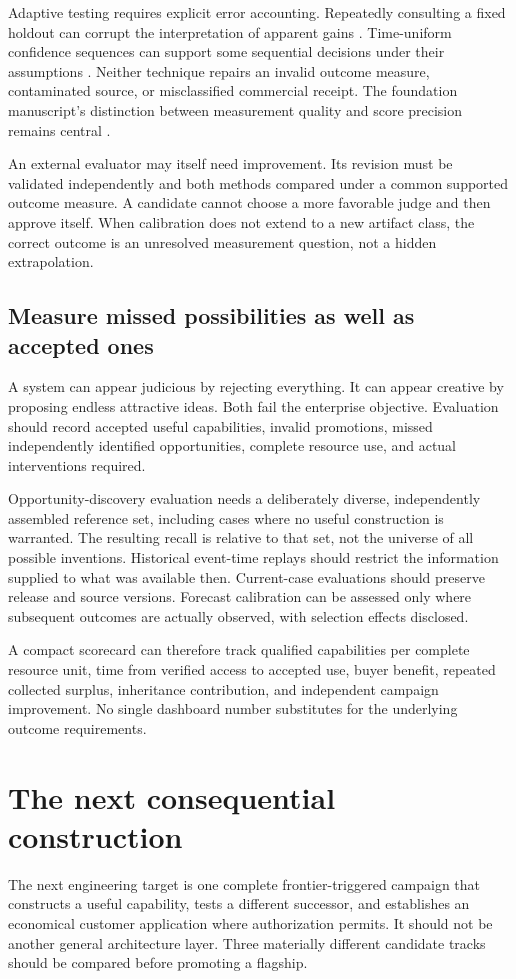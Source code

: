 \documentclass[11pt,letterpaper]{article}
\theoremstyle{remark}\newtheorem{remark}{Remark}[section]
\begin{document}
Adaptive testing requires explicit error accounting. Repeatedly consulting a fixed holdout can corrupt the interpretation of apparent gains \citep{dwork2014}. Time-uniform confidence sequences can support some sequential decisions under their assumptions \citep{howard2021}. Neither technique repairs an invalid outcome measure, contaminated source, or misclassified commercial receipt. The foundation manuscript's distinction between measurement quality and score precision remains central \citep{boucher2026ti}.

An external evaluator may itself need improvement. Its revision must be validated independently and both methods compared under a common supported outcome measure. A candidate cannot choose a more favorable judge and then approve itself. When calibration does not extend to a new artifact class, the correct outcome is an unresolved measurement question, not a hidden extrapolation.

\subsection{Measure missed possibilities as well as accepted ones}
A system can appear judicious by rejecting everything. It can appear creative by proposing endless attractive ideas. Both fail the enterprise objective. Evaluation should record accepted useful capabilities, invalid promotions, missed independently identified opportunities, complete resource use, and actual interventions required.

Opportunity-discovery evaluation needs a deliberately diverse, independently assembled reference set, including cases where no useful construction is warranted. The resulting recall is relative to that set, not the universe of all possible inventions. Historical event-time replays should restrict the information supplied to what was available then. Current-case evaluations should preserve release and source versions. Forecast calibration can be assessed only where subsequent outcomes are actually observed, with selection effects disclosed.

A compact scorecard can therefore track qualified capabilities per complete resource unit, time from verified access to accepted use, buyer benefit, repeated collected surplus, inheritance contribution, and independent campaign improvement. No single dashboard number substitutes for the underlying outcome requirements.

\section{The next consequential construction}\label{sec:construction}
The next engineering target is one complete frontier-triggered campaign that constructs a useful capability, tests a different successor, and establishes an economical customer application where authorization permits. It should not be another general architecture layer. Three materially different candidate tracks should be compared before promoting a flagship.
\end{document}
